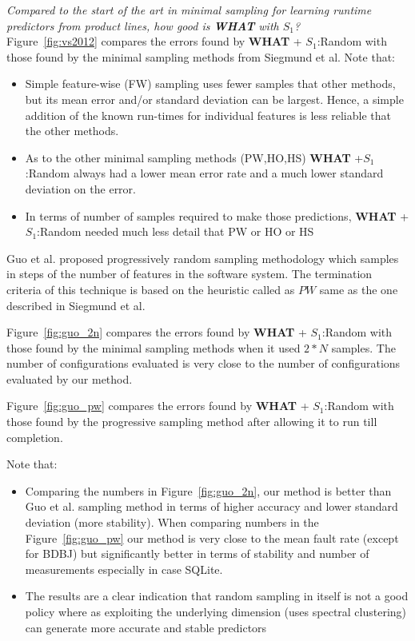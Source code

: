 \documentclass{sig-alternative}
\newcommand{\bi}{\begin{itemize}}%
\newcommand{\ei}{\end{itemize}}
\newcommand{\fig}[1]{Figure~\ref{fig:#1}}
\newcommand{\what}{{\bf WHAT }}
\begin{document}
{\em Compared to the start of the art in minimal sampling for
learning runtime predictors from product lines, how good is \what with $S_1$?}\\







\fig{vs2012} compares the errors found by  \what+ $S_1$:Random with those found by the minimal sampling
methods from Siegmund et al. Note that:
\bi
\item
Simple feature-wise (FW) sampling uses fewer samples that 
other methods, but its mean error and/or standard deviation can be largest. Hence, a simple addition
of the known run-times for individual features is less reliable that the other methods.
\item
As to the other minimal sampling methods  (PW,HO,HS)  \what+$S_1$:Random always had a   lower mean
error rate and a much lower standard deviation on the error.  
\item In terms of number of samples required to make those predictions, \what+$S_1$:Random needed
much less detail that PW or HO or HS
\ei


Guo et al. proposed progressively random sampling methodology which samples in steps of the number of features in the software system. The termination criteria of this technique is based on the heuristic called as $PW$ same as the one described in  Siegmund et al.

\fig{guo_2n} compares the errors found by  \what+ $S_1$:Random with those found by the minimal sampling
methods when it used $2*N$ samples. The number of configurations evaluated is very close to the  number of configurations evaluated by our method.

\fig{guo_pw} compares the errors found by  \what+ $S_1$:Random with those found by the progressive sampling method  after allowing it to run till completion.

Note that: 
\bi
\item
Comparing the numbers in \fig{guo_2n}, our method is better than Guo et al. sampling method in terms of higher accuracy and lower standard deviation (more stability). When comparing numbers in the \fig{guo_pw} our method is very close to the mean fault rate (except for BDBJ) but significantly better in terms of stability and number of measurements especially in case SQLite.
\item
The results are a clear indication that random sampling in itself is not a good policy where as exploiting the underlying dimension (uses spectral clustering) can generate more accurate and stable predictors
\ei
\end{document}
